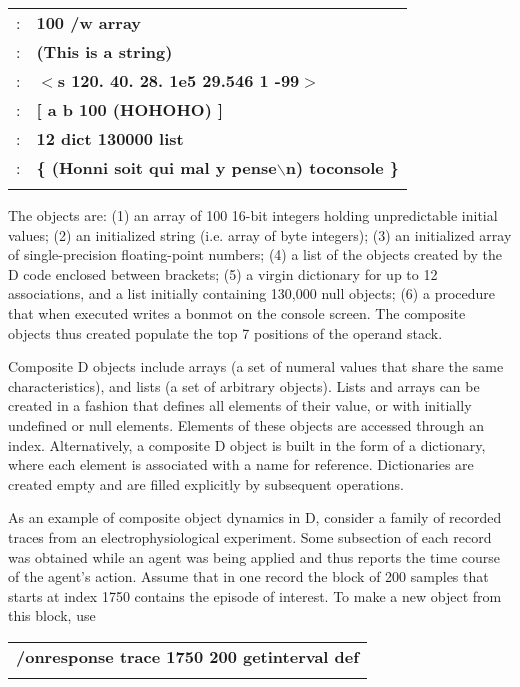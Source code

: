 \begin{tabular}{>{\normalfont}l>{\sffamily\bfseries}l}
1: & 100 /w array\\
2: & (This is a string)\\
3: & $<$s 120. 40. 28. 1e5 29.546 1 -99$>$\\
4: & [ a b 100 (HOHOHO) ]\\
5: & 12 dict  130000 list\\
6: & \{ (Honni soit qui mal y pense$\backslash$n) toconsole \}\\\\
\end{tabular}

\noindent The objects are:  (1) an array of 100 16-bit integers holding unpredictable initial values;  (2)  an  initialized string  (i.e.  array  of  byte integers);  (3)  an initialized array of single-precision  floating-point numbers;  (4)  a  list of the objects created by the D code enclosed between  brackets;  (5)  a virgin  dictionary  for  up to 12  associations,  and  a  list  initially containing 130,000 null objects;  (6) a procedure that when executed writes  a bonmot on the console screen.  The composite objects thus created populate the top 7 positions of the operand stack.

Composite  D objects include arrays (a set of numeral values that  share the  same  characteristics),  and  lists (a set  of  arbitrary  objects). Lists and arrays can be created in a fashion that defines all elements of their value,  or with initially undefined or null elements.  Elements  of these objects are accessed through an index. Alternatively, a composite D object  is  built  in the form of a dictionary,  where  each  element  is associated with a name for reference.  Dictionaries are created empty and are filled explicitly by subsequent operations.

As  an example of composite object dynamics in D,  consider a family  of recorded traces from an electrophysiological experiment.  Some subsection of each record was obtained while an agent was being applied and thus reports the time course of the agent's action.  Assume that in one record  the block of 200 samples that starts at index 1750 contains the episode of interest. To make a new object from this block, use\\

\begin{tabular}{>{\sffamily\bfseries}l}
   /onresponse trace 1750 200 getinterval def\\\\
\end{tabular}


